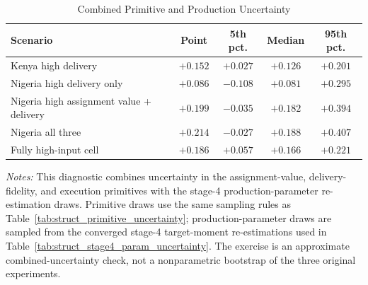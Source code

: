 \begin{table}[H]
\centering
\caption{Combined Primitive and Production Uncertainty}
\label{tab:struct_combined_uncertainty}
\begin{threeparttable}
\begin{tabular}[t]{lcccc}
\toprule
Scenario & Point & 5th pct. & Median & 95th pct. \\
\midrule
Kenya high delivery & $+0.152$ & $+0.027$ & $+0.126$ & $+0.201$ \\
Nigeria high delivery only & $+0.086$ & $-0.108$ & $+0.081$ & $+0.295$ \\
Nigeria high assignment value + delivery & $+0.199$ & $-0.035$ & $+0.182$ & $+0.394$ \\
Nigeria all three & $+0.214$ & $-0.027$ & $+0.188$ & $+0.407$ \\
Fully high-input cell & $+0.186$ & $+0.057$ & $+0.166$ & $+0.221$ \\
\bottomrule
\end{tabular}
\begin{tablenotes}
\footnotesize
\item \textit{Notes:} This diagnostic combines uncertainty in the assignment-value, delivery-fidelity, and execution primitives with the stage-4 production-parameter re-estimation draws. Primitive draws use the same sampling rules as Table~\ref{tab:struct_primitive_uncertainty}; production-parameter draws are sampled from the converged stage-4 target-moment re-estimations used in Table~\ref{tab:struct_stage4_param_uncertainty}. The exercise is an approximate combined-uncertainty check, not a nonparametric bootstrap of the three original experiments.
\end{tablenotes}
\end{threeparttable}
\end{table}
